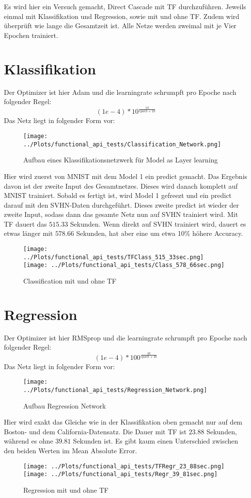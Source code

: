 Es wird hier ein Versuch gemacht, Direct Cascade mit TF 
durchzuführen. Jeweils einmal mit Klassifikation und Regression, 
sowie mit und ohne TF. Zudem wird überprüft wie lange die 
Gesamtzeit ist. Alle Netze werden zweimal mit je Vier Epochen 
trainiert. 

\section{Klassifikation}
Der Optimizer ist hier Adam und die learningrate schrumpft pro 
Epoche nach folgender Regel:
\begin{equation}
    (1e-4) * 10^{\frac{10}{epoch + 10}}
\end{equation}
Das Netz liegt in folgender Form vor: 
\begin{figure}[htpb]
    \texttt{[image: ../Plots/functional\_api\_tests/Classification\_Network.png]}
    \caption{\label{fig:figure16} Aufbau eines Klassifikationsnetzwerk für Model as Layer learning}
\end{figure}
Hier wird zuerst von MNIST mit dem Model 1 ein predict gemacht. Das Ergebnis davon 
ist der zweite Input des Gesamtnetzes. Dieses wird danach komplett 
auf MNIST trainiert. Sobald es fertigt ist, wird Model 1 gefreezt und 
ein predict darauf mit den SVHN-Daten durchgeführt. 
Dieses zweite predict ist wieder der zweite Input, sodass dann 
das gesamte Netz nun auf SVHN trainiert wird. Mit TF dauert das 
$515.33$ Sekunden. Wenn direkt auf SVHN trainiert wird, dauert es etwas 
länger mit $578.66$ Sekunden, hat aber eine um etwa 10\% höhere Accuracy.
\begin{figure}[htpb]
    \texttt{[image: ../Plots/functional\_api\_tests/TFClass\_515\_33sec.png]}
    \texttt{[image: ../Plots/functional\_api\_tests/Class\_578\_66sec.png]}
    \caption{\label{fig:figure17} Classification mit und ohne TF}
\end{figure}


\section{Regression}
Der Optimizer ist hier RMSprop und die learningrate schrumpft pro Epoche nach 
folgender Regel: 
\begin{equation}
    (1e-4) * 100^{\frac{10}{epoch + 10}}
\end{equation}
Das Netz liegt in folgender Form vor:
\begin{figure}[htpb]
    \texttt{[image: ../Plots/functional\_api\_tests/Regression\_Network.png]}
    \caption{\label{fig:figure18} Aufbau Regression Network}
\end{figure}
Hier wird exakt das Gleiche wie in der Klassifikation oben gemacht nur auf dem 
Boston- und dem California-Datensatz. Die Dauer mit TF ist $23.88$ Sekunden, während 
es ohne $39.81$ Sekunden ist. Es gibt kaum einen Unterschied zwischen den beiden 
Werten im Mean Absolute Error.
\begin{figure}
    \texttt{[image: ../Plots/functional\_api\_tests/TFRegr\_23\_88sec.png]}
    \texttt{[image: ../Plots/functional\_api\_tests/Regr\_39\_81sec.png]}
    \caption{\label{fig:figure19} Regression mit und ohne TF}
\end{figure}